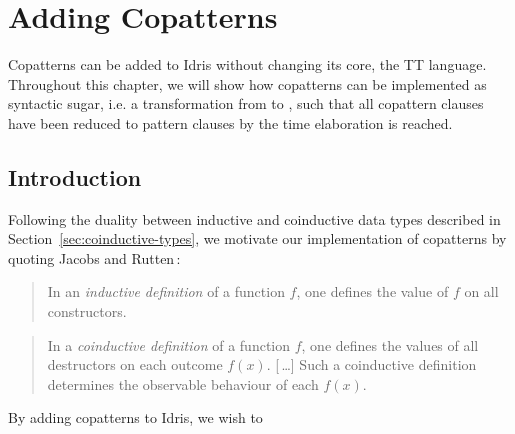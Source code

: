 \chapter{Adding Copatterns}
\label{sec:adding_copatterns}
Copatterns can be added to Idris without changing its core, the TT
language. Throughout this chapter, we will show how copatterns can be implemented as
syntactic sugar, i.e. a transformation from \IdrisM{} to \IdrisM{}, such that
all copattern clauses have been reduced to pattern clauses by the
time elaboration is reached.

\section{Introduction}
Following the duality between inductive and coinductive data types described in
Section~\ref{sec:coinductive-types}, we motivate our implementation of
copatterns by quoting Jacobs and Rutten\,\citep{Jacobs97atutorial}:

\begin{quote}
In an \emph{inductive definition} of a function $f$, one defines the value of $f$ on all constructors.
\end{quote}

\begin{quote}
In a \emph{coinductive definition} of a function $f$, one defines the values of all
destructors on each outcome $f(x)$. [$\,$\ldots] Such a coinductive definition
determines the observable behaviour of each $f(x)$.
\end{quote}

By adding copatterns to Idris, we wish to 

